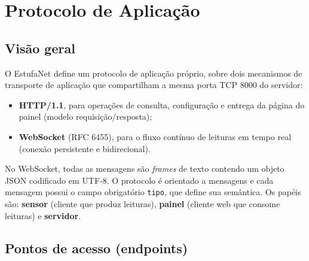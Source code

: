 \documentclass[12pt,a4paper]{article}
\begin{document}
\section{Protocolo de Aplica\c{c}\~ao}
\label{sec:protocolo}

\subsection{Vis\~ao geral}

O EstufaNet define um protocolo de aplica\c{c}\~ao pr\'oprio, sobre dois
mecanismos de transporte de aplica\c{c}\~ao que compartilham a mesma porta
TCP 8000 do servidor:

\begin{itemize}
  \item \textbf{HTTP/1.1}, para opera\c{c}\~oes de consulta, configura\c{c}\~ao e
        entrega da p\'agina do painel (modelo requisi\c{c}\~ao/resposta);
  \item \textbf{WebSocket} (RFC 6455), para o fluxo cont\'inuo de leituras em
        tempo real (conex\~ao persistente e bidirecional).
\end{itemize}

No WebSocket, todas as mensagens s\~ao \emph{frames} de texto contendo um
objeto JSON codificado em UTF-8. O protocolo \'e orientado a mensagens e
cada mensagem possui o campo obrigat\'orio \texttt{tipo}, que define sua
sem\^antica. Os pap\'eis s\~ao: \textbf{sensor} (cliente que produz leituras),
\textbf{painel} (cliente web que consome leituras) e \textbf{servidor}.

\subsection{Pontos de acesso (endpoints)}
\end{document}
